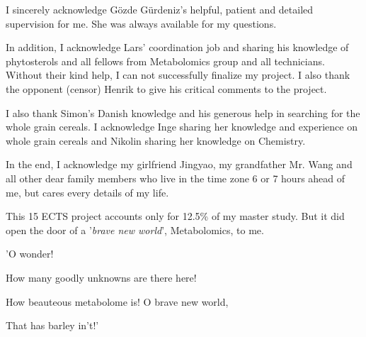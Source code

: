 I sincerely acknowledge Gözde Gürdeniz's helpful, patient and detailed supervision for me. She was always available for my questions.

In addition, I acknowledge Lars' coordination job and sharing his knowledge of phytosterols and all fellows from Metabolomics group and all technicians. Without their kind help, I can not successfully finalize my project. I also thank the opponent (censor) Henrik to give his critical comments to the project.

I also thank Simon's Danish knowledge and his generous help in searching for the whole grain cereals. I acknowledge Inge sharing her knowledge and experience on whole grain cereals and Nikolin sharing her knowledge on Chemistry.

In the end, I acknowledge my girlfriend Jingyao, my grandfather Mr. Wang and all other dear family members who live in the time zone 6 or 7 hours ahead of me, but cares every details of my life.

This 15 ECTS project accounts only for 12.5\% of my master study. But it did open the door of a '\textit{brave new world}', Metabolomics, to me.

'O wonder!

How many goodly unknowns are there here!

How beauteous metabolome is! O brave new world,

That has barley in't!'
